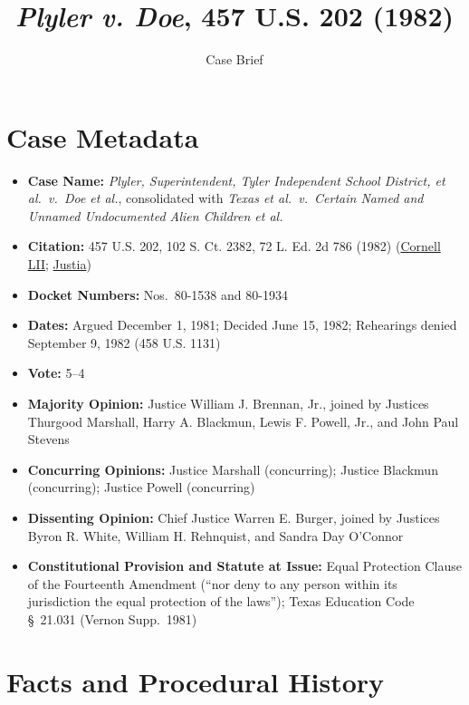 \documentclass[12pt]{article}
\title{\textit{Plyler v. Doe}, 457 U.S. 202 (1982)}
\author{Case Brief}
\date{}
\begin{document}
\maketitle


\section{Case Metadata}

\begin{itemize}
    \item \textbf{Case Name:} \textit{Plyler, Superintendent, Tyler Independent School District, et al.\ v.\ Doe et al.}, consolidated with \textit{Texas et al.\ v.\ Certain Named and Unnamed Undocumented Alien Children et al.}
    \item \textbf{Citation:} 457 U.S. 202, 102 S. Ct. 2382, 72 L. Ed. 2d 786 (1982) (\href{https://www.law.cornell.edu/supremecourt/text/457/202}{Cornell LII}; \href{https://supreme.justia.com/cases/federal/us/457/202/}{Justia})
    \item \textbf{Docket Numbers:} Nos.\ 80-1538 and 80-1934
    \item \textbf{Dates:} Argued December 1, 1981; Decided June 15, 1982; Rehearings denied September 9, 1982 (458 U.S. 1131)
    \item \textbf{Vote:} 5--4
    \item \textbf{Majority Opinion:} Justice William J. Brennan, Jr., joined by Justices Thurgood Marshall, Harry A. Blackmun, Lewis F. Powell, Jr., and John Paul Stevens
    \item \textbf{Concurring Opinions:} Justice Marshall (concurring); Justice Blackmun (concurring); Justice Powell (concurring)
    \item \textbf{Dissenting Opinion:} Chief Justice Warren E. Burger, joined by Justices Byron R. White, William H. Rehnquist, and Sandra Day O'Connor
    \item \textbf{Constitutional Provision and Statute at Issue:} Equal Protection Clause of the Fourteenth Amendment (``nor deny to any person within its jurisdiction the equal protection of the laws''); Texas Education Code \S~21.031 (Vernon Supp.\ 1981)
\end{itemize}

\section{Facts and Procedural History}
\end{document}
